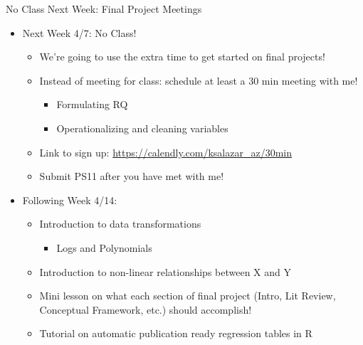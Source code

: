 \documentclass[
  8pt,
  ignorenonframetext,
  dvipsnames]{beamer}
\providecommand{\tightlist}{%
  \setlength{\itemsep}{0pt}\setlength{\parskip}{0pt}}
\let\olditem\item
\renewcommand{\item}{%
  \olditem\vspace{4pt}
}
\begin{document}
\begin{frame}{No Class Next Week: Final Project Meetings}
\protect\hypertarget{no-class-next-week-final-project-meetings}{}

\begin{itemize}
\tightlist
\item
  Next Week 4/7: No Class!

  \begin{itemize}
  \tightlist
  \item
    We're going to use the extra time to get started on final projects!
  \item
    Instead of meeting for class: schedule at least a 30 min meeting
    with me!

    \begin{itemize}
    \tightlist
    \item
      Formulating RQ
    \item
      Operationalizing and cleaning variables
    \end{itemize}
  \item
    Link to sign up: \url{https://calendly.com/ksalazar_az/30min}
  \item
    Submit PS11 after you have met with me!
  \end{itemize}
\end{itemize}

\medskip

\begin{itemize}
\item
  Following Week 4/14:

  \begin{itemize}
  \tightlist
  \item
    Introduction to data transformations

    \begin{itemize}
    \tightlist
    \item
      Logs and Polynomials
    \end{itemize}
  \item
    Introduction to non-linear relationships between X and Y
  \item
    Mini lesson on what each section of final project (Intro, Lit
    Review, Conceptual Framework, etc.) should accomplish!
  \item
    Tutorial on automatic publication ready regression tables in R
  \end{itemize}
\end{itemize}

\end{frame}
\end{document}
